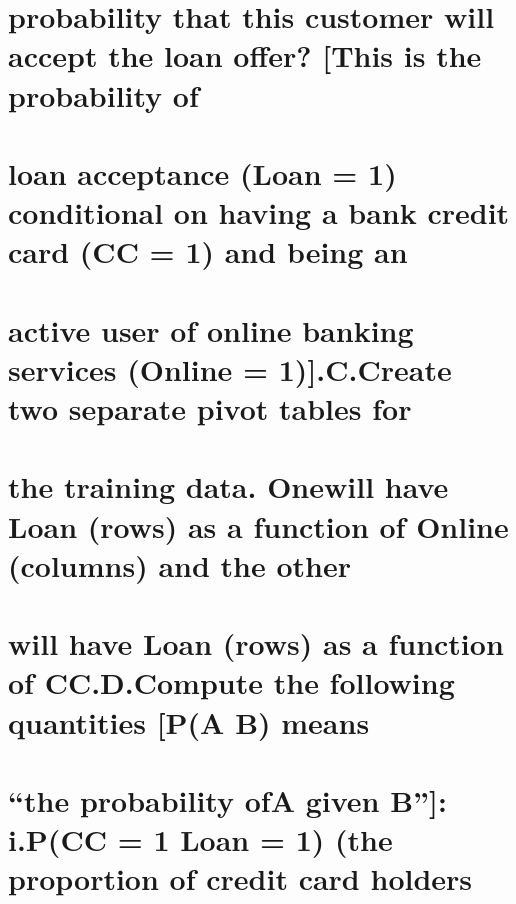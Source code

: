 \documentclass[
]{article}
\begin{document}
\hypertarget{probability-that-this-customer-will-accept-the-loan-offer-this-is-the-probability-of}{%
\section{probability that this customer will accept the loan offer?
{[}This is the probability
of}\label{probability-that-this-customer-will-accept-the-loan-offer-this-is-the-probability-of}}

\hypertarget{loan-acceptance-loan-1-conditional-on-having-a-bank-credit-card-cc-1-and-being-an}{%
\section{loan acceptance (Loan = 1) conditional on having a bank credit
card (CC = 1) and being
an}\label{loan-acceptance-loan-1-conditional-on-having-a-bank-credit-card-cc-1-and-being-an}}

\hypertarget{active-user-of-online-banking-services-online-1.c.create-two-separate-pivot-tables-for}{%
\section{active user of online banking services (Online = 1){]}.C.Create
two separate pivot tables
for}\label{active-user-of-online-banking-services-online-1.c.create-two-separate-pivot-tables-for}}

\hypertarget{the-training-data.-onewill-have-loan-rows-as-a-function-of-online-columns-and-the-other}{%
\section{the training data. Onewill have Loan (rows) as a function of
Online (columns) and the
other}\label{the-training-data.-onewill-have-loan-rows-as-a-function-of-online-columns-and-the-other}}

\hypertarget{will-have-loan-rows-as-a-function-of-cc.d.compute-the-following-quantities-pa-b-means}{%
\section{will have Loan (rows) as a function of CC.D.Compute the
following quantities {[}P(A \textbar{} B)
means}\label{will-have-loan-rows-as-a-function-of-cc.d.compute-the-following-quantities-pa-b-means}}

\hypertarget{the-probability-ofa-given-b-i.pcc-1-loan-1-the-proportion-of-credit-card-holders}{%
\section{``the probability ofA given B''{]}: i.P(CC = 1 \textbar{} Loan
= 1) (the proportion of credit card
holders}\label{the-probability-ofa-given-b-i.pcc-1-loan-1-the-proportion-of-credit-card-holders}}
\end{document}
